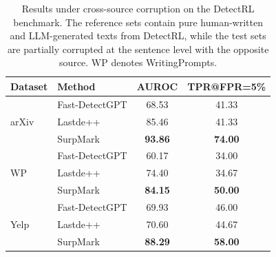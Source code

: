 \documentclass{article}
\theoremstyle{plain}
\theoremstyle{definition}
\theoremstyle{remark}
\begin{document}
\begin{table}[t]
\centering
\scriptsize
\caption{Results under cross-source corruption on the DetectRL benchmark. The reference sets contain pure human-written and LLM-generated texts from DetectRL, while the test sets are partially corrupted at the sentence level with the opposite source. WP denotes WritingPrompts.}
\label{table:cross_source_corruption}
\begin{tabular}{llcc}
\toprule
Dataset & Method & AUROC & TPR@FPR=5\% \\
\midrule
\multirow{3}{*}{arXiv}
& Fast-DetectGPT & 68.53 & 41.33 \\
& Lastde++ & 85.46 & 41.33 \\
& \cellcolor{ours}SurpMark & \cellcolor{ours}\textbf{93.86} & \cellcolor{ours} \textbf{74.00} \\
\midrule
\multirow{3}{*}{WP}
& Fast-DetectGPT & 60.17 & 34.00 \\
& Lastde++ & 74.40 & 34.67 \\
& \cellcolor{ours} SurpMark & \cellcolor{ours} \textbf{84.15} & \cellcolor{ours} \textbf{50.00} \\
\midrule
\multirow{3}{*}{Yelp}
& Fast-DetectGPT & 69.93 & 46.00 \\
& Lastde++ & 70.60 & 44.67 \\
& \cellcolor{ours}SurpMark & \cellcolor{ours}\textbf{88.29} & \cellcolor{ours}\textbf{58.00} \\
\bottomrule
\end{tabular}
\end{table}
\vspace{-2mm}
\end{document}
